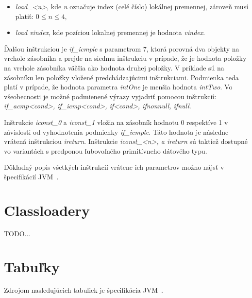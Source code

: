 \documentclass[11pt,final,oneside]{fithesis}
\begin{document}
\begin{itemize}
\item \textit{load\_<n>}, kde \textit{n} označuje index (celé číslo) lokálnej 
premennej, zároveň musí platiť: $0 \leq n \leq 4$,
\item \textit{load vindex}, kde pozíciou lokalnej premennej je hodnota
\textit{vindex}.
\end{itemize}

Ďalšou inštrukciou je \textit{if\_icmple} s parametrom 7, ktorá porovná dva 
objekty na vrchole zásobníka a prejde na siedmu inštrukciu v prípade, že je 
hodnota položky na vrchole zásobníka väčšia ako hodnota druhej položky. V 
príklade sú na zásobníku len položky vložené predchádzajúcimi inštrukciami.
Podmienka teda platí v prípade, že hodnota parametra \textit{intOne} je menšia 
hodnota \textit{intTwo}. Vo všeobecnosti je možné podmienené výrazy vyjadriť 
pomocou inštrukcií: \textit{if\_acmp<cond>, if\_icmp<cond>, if<cond>, 
ifnonnull, ifnull}.

Inštrukcie \textit{iconst\_0} a \textit{iconst\_1} vložia na zásobník hodnotu 0
respektíve 1 v závislosti od vyhodnotenia podmienky \textit{if\_icmple}. Táto 
hodnota je následne vrátená inštrukciou \textit{ireturn}. Inštrukcie
\textit{iconst\_<n>, a ireturn} sú taktiež dostupné vo variantách s predponou 
ľubovoľného primitívneho dátového typu.

Dôkladný popis všetkých inštrukcií vrátene ich parametrov možno nájsť v 
špecifikácií JVM~\cite{Lindholm:2013:JVM:2462629}.

\chapter{Classloadery}
TODO...

\clearpage
{} 
 
 

\appendix

\chapter{Tabuľky}
Zdrojom nasledujúcich tabuliek je špecifikácia
JVM~\cite{Lindholm:2013:JVM:2462629}.
\end{document}
